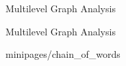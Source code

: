 \documentclass[xcolor=x11names,compress]{beamer}
\begin{document}
{
\begin{frame}[t]{Multilevel Graph Analysis}
    \vspace{-0.2cm}
    
\end{frame}}

{
\begin{frame}[t]{Multilevel Graph Analysis}
    \vspace{-0.2cm}
    
     {minipages/chain_of_words}
\end{frame}}
\end{document}
